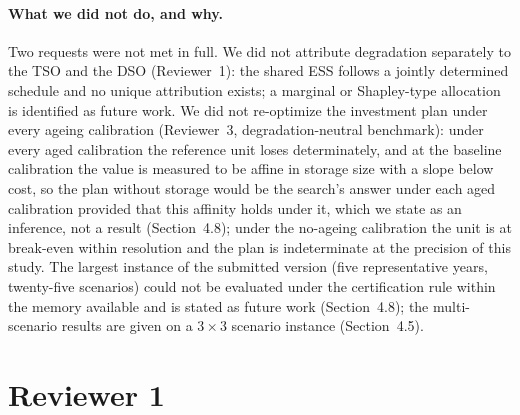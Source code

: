 \documentclass[11pt]{article}
\begin{document}
\paragraph{What we did not do, and why.}
Two requests were not met in full. We did not attribute degradation separately to the TSO and the DSO (Reviewer~1): the shared ESS follows a jointly determined schedule and no unique attribution exists; a marginal or Shapley-type allocation is identified as future work. We did not re-optimize the investment plan under every ageing calibration (Reviewer~3, degradation-neutral benchmark): under every aged calibration the reference unit loses determinately, and at the baseline calibration the value is measured to be affine in storage size with a slope below cost, so the plan without storage would be the search's answer under each aged calibration provided that this affinity holds under it, which we state as an inference, not a result (Section~4.8); under the no-ageing calibration the unit is at break-even within resolution and the plan is indeterminate at the precision of this study. The largest instance of the submitted version (five representative years, twenty-five scenarios) could not be evaluated under the certification rule within the memory available and is stated as future work (Section~4.8); the multi-scenario results are given on a $3\times3$ scenario instance (Section~4.5).

\section*{Reviewer 1}
\end{document}
